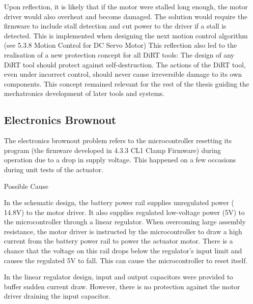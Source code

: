 Upon reflection, it is likely that if the motor were stalled long enough, the motor driver would also overheat and become damaged. The solution would require the firmware to include stall detection and cut power to the driver if a stall is detected. This is implemented when designing the next motion control algorithm (see 5.3.8 Motion Control for DC Servo Motor)
This reflection also led to the realisation of a new protection concept for all DiRT tools: The design of any DiRT tool should protect against self-destruction. The actions of the DiRT tool, even under incorrect control, should never cause irreversible damage to its own components. This concept remained relevant for the rest of the thesis guiding the mechatronics development of later tools and systems.

\subsection{Electronics Brownout}
\label{subsection:exploration_1_electronics_brownout}

The electronics brownout problem refers to the microcontroller resetting its program (the firmware developed in 4.3.3 CL1 Clamp Firmware) during operation due to a drop in supply voltage. This happened on a few occasions during unit tests of the actuator.

Possible Cause

In the schematic design, the battery power rail supplies unregulated power (~ 14.8V) to the motor driver. It also supplies regulated low-voltage power (5V) to the microcontroller through a linear regulator. When overcoming large assembly resistance, the motor driver is instructed by the microcontroller to draw a high current from the battery power rail to power the actuator motor. There is a chance that the voltage on this rail drops below the regulator’s input limit and causes the regulated 5V to fall. This can cause the microcontroller to reset itself.

In the linear regulator design, input and output capacitors were provided to buffer sudden current draw. However, there is no protection against the motor driver draining the input capacitor.

